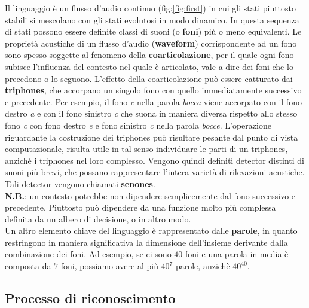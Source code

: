 \documentclass[12pt]{article}
\begin{document}
    Il linguaggio è un flusso d'audio continuo (fig:\ref{fig:first}) in cui gli stati piuttosto stabili si mescolano con gli stati evolutosi in modo dinamico. In questa sequenza di stati possono essere definite classi di suoni (o \textbf{foni}) più o meno equivalenti. Le proprietà acustiche di un flusso d'audio (\textbf{waveform}) corrispondente ad un fono sono spesso soggette al fenomeno della \textbf{coarticolazione}, per il quale ogni fono subisce l'influenza del contesto nel quale è articolato, vale a dire dei foni che lo precedono o lo seguono.
    L'effetto della coarticolazione può essere catturato dai \textbf{triphones}, che accorpano un singolo fono con quello immediatamente successivo e precedente. Per esempio, il fono \textit{c}  nella parola \textit{bocca} viene accorpato con il fono destro \textit{a} e con il fono sinistro \textit{c} che suona in maniera diversa rispetto allo stesso fono \textit{c} con fono destro \textit{e} e fono sinistro \textit{c} nella parola \textit{bocce}.
    L'operazione riguardante la costruzione dei triphones può risultare pesante dal punto di vista computazionale, risulta utile in tal senso individuare le parti di un triphones, anziché i triphones nel loro complesso. 
    Vengono quindi definiti detector distinti di suoni più brevi, che possano rappresentare l'intera varietà di rilevazioni acustiche. 
    Tali detector vengono chiamati \textbf{senones}.\\
    \textbf{N.B.}: un contesto potrebbe non dipendere semplicemente dal fono successivo e precedente. Piuttosto può dipendere da una funzione molto più complessa definita da un albero di decisione, o in altro modo.\\
    Un altro elemento chiave del linguaggio è rappresentato dalle \textbf{parole}, in quanto restringono in maniera significativa la dimensione dell'insieme derivante dalla combinazione dei foni. Ad esempio, se ci sono $40$ foni e una parola in media è composta da $7$ foni, possiamo avere al più $40^7$ parole, anzichè $40^{40}$.  
        
    \subsection{Processo di riconoscimento}    
    
\end{document}

